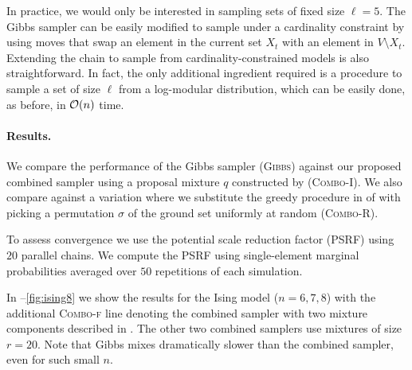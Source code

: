 In practice, we would only be interested in sampling sets of fixed size $\ell = 5$.
The Gibbs sampler can be easily modified to sample under a cardinality constraint by using moves that swap an element in the current set $X_t$ with an element in $V \setminus X_t$.
Extending the \Ms{} chain to sample from cardinality-constrained models is also straightforward.
In fact, the only additional ingredient required is a procedure to sample a set of size $\ell$ from a log-modular distribution, which can be easily done, as before, in $\mathcal{O}(n)$ time.

\paragraph{Results.}
We compare the performance of the Gibbs sampler (\textsc{Gibbs}) against our proposed combined sampler using a proposal mixture $q$ constructed by  (\textsc{Combo-I}).
We also compare against a variation where we substitute the greedy procedure in  of  with picking a permutation $\sigma$ of the ground set uniformly at random (\textsc{Combo-R}).

To assess convergence we use the potential scale reduction factor (PSRF) \citep{brooks11} using $20$ parallel chains.
We compute the PSRF using single-element marginal probabilities averaged over $50$ repetitions of each simulation.

In --\ref{fig:ising8} we show the results for the Ising model ($n = 6, 7, 8$) with the additional \textsc{Combo-f} line denoting the combined sampler with two mixture components described in .
The other two combined samplers use mixtures of size $r = 20$.
Note that Gibbs mixes dramatically slower than the combined sampler, even for such small $n$.

